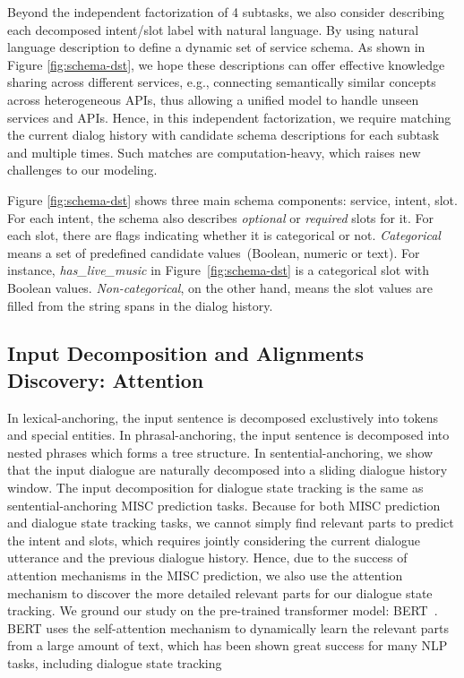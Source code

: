 Beyond the independent factorization of 4 subtasks, we also consider
describing each decomposed intent/slot label with natural
language. By using natural language description to define a dynamic
set of service schema. As shown in Figure \ref{fig:schema-dst}, we
hope these descriptions can offer effective knowledge sharing across
different services, e.g., connecting semantically similar concepts
across heterogeneous APIs, thus allowing a unified model to handle
unseen services and APIs. Hence, in this independent factorization, we
require matching the current dialog history with candidate schema
descriptions for each subtask and multiple times. Such matches are
computation-heavy, which raises new challenges to our modeling.


 Figure \ref{fig:schema-dst} shows three
main schema components: service, intent, slot. For each intent, the
schema also describes {\it optional} or {\it required} slots for
it. For each slot, there are flags indicating whether it is
categorical or not. {\it Categorical} means a set of
predefined candidate values~(Boolean, numeric or text). For instance,
{\it has\_live\_music} in Figure~\ref{fig:schema-dst} is a categorical
slot with Boolean values. {\it Non-categorical}, on the other hand,
means the slot values are filled from the string spans in the dialog
history.

\subsection{Input Decomposition and Alignments Discovery: Attention}
\label{sec:sgd:decompose-x}
In lexical-anchoring, the input sentence is decomposed exclustively
into tokens and special entities. In phrasal-anchoring, the input
sentence is decomposed into nested phrases which forms a tree
structure. In sentential-anchoring, we show that the input dialogue
are naturally decomposed into a sliding dialogue history window. The
input decomposition for dialogue state tracking is the same as
sentential-anchoring MISC prediction tasks. Because for both MISC
prediction and dialogue state tracking tasks, we cannot simply find
relevant parts to predict the intent and slots, which requires jointly
considering the current dialogue utterance and the previous dialogue
history. Hence, due to the success of attention mechanisms in the MISC
prediction, we also use the attention mechanism to discover the more
detailed relevant parts for our dialogue state tracking. We ground our
study on the pre-trained transformer model:
BERT~\cite{devlin2018bert}. BERT uses the self-attention mechanism to
dynamically learn the relevant parts from a large amount of text,
which has been shown great success for many NLP tasks, including
dialogue state tracking~\cite{chao2019bert,noroozi2020fast}

